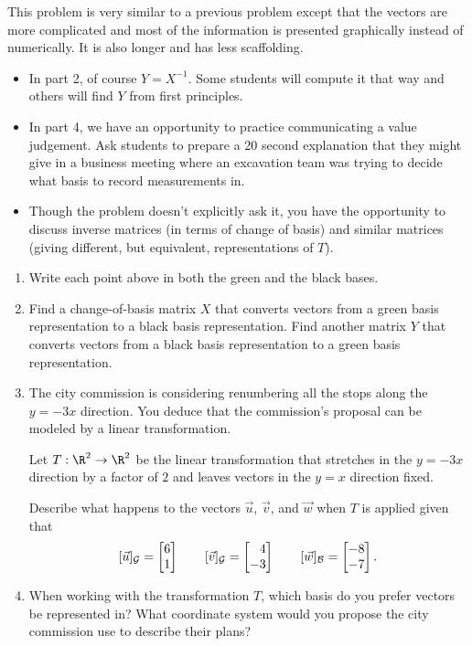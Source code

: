 \begin{iola}
	\begin{annotation}
		\begin{notes}
			This problem is very similar to a previous problem except that
			the vectors are more complicated and most of the information
			is presented graphically instead of numerically. It is also
			longer and has less scaffolding.

			\begin{itemize}
				\item In part 2, of course $Y=X^{-1}$. Some students will
					compute it that way and others will find $Y$ from
					first principles.
				\item In part 4, we have an opportunity to practice communicating
					a value judgement. Ask students to prepare a 20 second explanation
					that they might give in a business meeting where an excavation
					team was trying to decide what basis to record measurements
					in.
				\item Though the problem doesn't explicitly ask it, you have the opportunity
					to discuss inverse matrices (in terms of change of basis) and similar
					matrices (giving different, but equivalent, representations of $T$).
			\end{itemize}
		\end{notes}
	\end{annotation}


\begin{enumerate}
	\item Write each point above in both the green and the black bases.
	\item Find a change-of-basis matrix $X$ that converts vectors from
		a green basis representation to a black basis representation. Find
		another matrix $Y$ that converts vectors from a black basis representation
		to a green basis representation.
	\item The city commission is considering renumbering all the stops along the $y=-3x$ direction.
		You deduce that the commission's proposal can be modeled by a linear transformation.

		Let $T:\R^2\to\R^2$ be the linear transformation that stretches in the $y=-3x$ direction
		by a factor of $2$ and leaves vectors in the $y=x$ direction fixed.

		Describe what happens to the vectors $\vec u$, $\vec v$, and $\vec w$ when
		$T$ is applied given that
		\[
			[\vec u]_{\mathcal G} = \mat{6\\1} \qquad
			[\vec v]_{\mathcal G} = \mat{4\\-3} \qquad
			[\vec w]_{\mathcal B} = \mat{-8\\-7}.
		\]
	\item When working with the transformation $T$, which basis do you prefer vectors be
		represented in? What coordinate system would you propose the city commission
		use to describe their plans?
\end{enumerate}
\end{iola}



